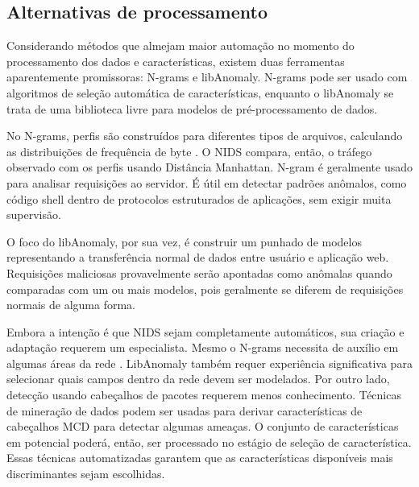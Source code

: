 \subsection{Alternativas de processamento}
Considerando métodos que almejam maior automação no momento do processamento dos dados e características, existem
duas ferramentas aparentemente promissoras: N-grams e libAnomaly. N-grams pode ser usado com algoritmos de seleção
automática de características, enquanto o libAnomaly se trata de uma biblioteca livre para modelos de pré-processamento
de dados.
\par No N-grams, perfis são construídos para diferentes tipos de arquivos, calculando as distribuições de frequência
de byte \cite{zhuowei03}. O NIDS compara, então, o tráfego observado com os perfis usando Distância Manhattan. N-gram é geralmente
usado para analisar requisições ao servidor. É útil em detectar padrões anômalos, como código shell dentro de
protocolos estruturados de aplicações, sem exigir muita supervisão.
\par O foco do libAnomaly, por sua vez, é construir um punhado de modelos representando a transferência normal de
dados entre usuário e aplicação web. Requisições maliciosas provavelmente serão apontadas como anômalas quando
comparadas com um ou mais modelos, pois geralmente se diferem de requisições normais de alguma forma.
\par Embora a intenção é que NIDS sejam completamente automáticos, sua criação e adaptação requerem um especialista.
Mesmo o N-grams necessita de auxílio em algumas áreas da rede \cite{zhuowei03}. LibAnomaly também requer experiência significativa
para selecionar quais campos dentro da rede devem ser modelados. Por outro lado, detecção usando cabeçalhos de
pacotes requerem menos conhecimento. Técnicas de mineração de dados podem ser usadas para derivar características de
cabeçalhos MCD para detectar algumas ameaças. O conjunto de características em potencial  poderá, então, ser processado no
estágio de seleção de característica. Essas técnicas automatizadas garantem que as características disponíveis mais discriminantes sejam
escolhidas.
